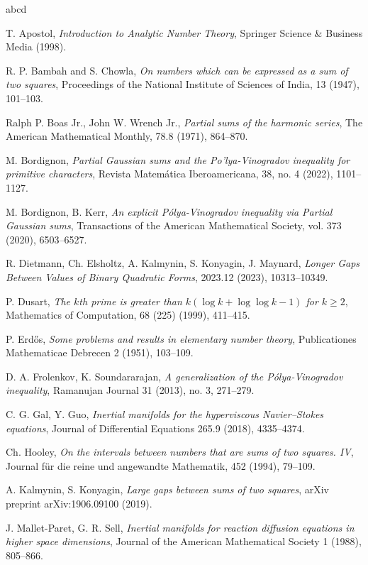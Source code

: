 \documentclass[a4paper]{amsart}
\newcommand{\1}{\mathbbm{1}}
\begin{document}
\begin{thebibliography}{abcd}

 T. Apostol, \emph{ Introduction to Analytic Number Theory}, Springer Science \& Business Media (1998).

 R. P. Bambah and S. Chowla, {\it On numbers which can be expressed as a sum of two squares}, Proceedings of the National Institute of Sciences of India, 13 (1947), 101--103.

 Ralph P. Boas Jr., John W. Wrench Jr., \emph{Partial sums of the harmonic series}, The American Mathematical Monthly, 78.8 (1971), 864--870.

 M. Bordignon, {\it Partial Gaussian sums and the Po’lya-Vinogradov inequality for primitive characters}, Revista Matemática Iberoamericana, 38, no. 4 (2022), 1101--1127.

 M. Bordignon, B. Kerr, {\it An explicit Pólya-Vinogradov inequality via Partial Gaussian sums}, Transactions of the American Mathematical Society, vol. 373 (2020), 6503--6527.

 R. Dietmann, Ch. Elsholtz, A. Kalmynin, S. Konyagin, J. Maynard, \emph{Longer Gaps Between Values of Binary Quadratic Forms}, 2023.12 (2023), 10313--10349.

 P. Dusart, {\it The $k$th prime is greater than $k(\log k + \log \log k - 1)$ for $k \geq 2$}, Mathematics of Computation, 68 (225) (1999), 411--415.

 P. Erd\H{o}s, {\it Some problems and results in elementary number theory}, Publicationes Mathematicae Debrecen 2 (1951), 103--109.

 D. A. Frolenkov, K. Soundararajan, {\it A generalization of the Pólya-Vinogradov inequality}, Ramanujan Journal 31 (2013), no. 3, 271--279.

 C. G. Gal, Y. Guo, {\it Inertial manifolds for the hyperviscous Navier–Stokes equations}, Journal of Differential Equations 265.9 (2018), 4335--4374.

 Ch. Hooley, {\it On the intervals between numbers that are sums of two squares. IV}, Journal für die reine und angewandte Mathematik, 452 (1994), 79--109.

 A. Kalmynin, S. Konyagin, \emph{Large gaps between sums of two squares}, arXiv preprint arXiv:1906.09100 (2019).

 J. Mallet-Paret, G. R. Sell, \emph{Inertial manifolds for reaction diffusion equations in higher space 
dimensions}, Journal of the American Mathematical Society 1 (1988), 805--866.


\end{thebibliography}
\end{document}
